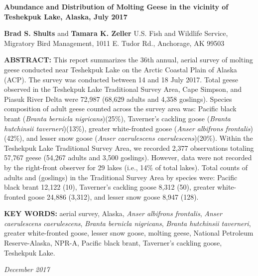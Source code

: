 \documentclass[]{article}
\title{}
\author{}
\date{}
\begin{document}
\pagestyle{fancy}
\renewcommand{\footrulewidth}{1pt} \renewcommand{\headrulewidth}{0pt}

\textbf{\LARGE{Abundance and Distribution of Molting Geese in the vicinity of Teshekpuk Lake, Alaska, July 2017}}
\hfill

\large
\textbf{Brad S. Shults} and \textbf{Tamara K. Zeller}\newline
U.S. Fish and Wildlife Service, Migratory Bird Management, 1011 E. Tudor
Rd., Anchorage, AK 99503

\textbf{\large{ABSTRACT:}} This report summarizes the 36th annual,
aerial survey of molting geese conducted near Teshekpuk Lake on the
Arctic Coastal Plain of Alaska (ACP). The survey was conducted between
14 and 18 July 2017. Total geese observed in the Teshekpuk Lake
Traditional Survey Area, Cape Simpson, and Piasuk River Delta were
72,987 (68,629 adults and 4,358 goslings). Species composition of adult
geese counted across the survey area was: Pacific black brant
(\textit{Branta bernicla nigricans})(25\%), Taverner's cackling goose
(\textit{Branta hutchinsii taverneri})(13\%), greater white-fronted
goose (\textit{Anser albifrons frontalis})(42\%), and lesser snow goose
(\textit{Anser caerulescens caerulescens})(20\%). Within the Teshekpuk
Lake Traditional Survey Area, we recorded 2,377 observations totaling
57,767 geese (54,267 adults and 3,500 goslings). However, data were not
recorded by the right-front observer for 29 lakes (i.e., 14\% of total
lakes). Total counts of adults and (goslings) in the Traditional Survey
Area by species were: Pacific black brant 12,122 (10), Taverner's
cackling goose 8,312 (50), greater white-fronted goose 24,886 (3,312),
and lesser snow goose 8,947 (128).

\textbf{KEY WORDS: }aerial survey, Alaska,
\textit{Anser albifrons frontalis},
\textit{Anser caerulescens caerulescens},
\textit{Branta bernicla nigricans},
\textit{Branta hutchinsii taverneri}, greater white-fronted goose,
lesser snow goose, molting geese, National Petroleum Reserve-Alaska,
NPR-A, Pacific black brant, Taverner's cackling goose, Teshekpuk Lake.

\hfill\textit {December 2017}
\end{document}
